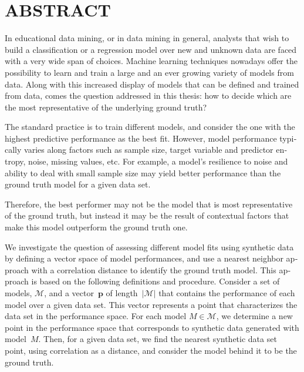 %

\chapter*{ABSTRACT}\thispagestyle{headings}
%
\begin{otherlanguage}{english}

In educational data mining, or in data mining in general, analysts that wish to build a classification or a regression model over new and unknown data are faced with a very wide span of choices.  Machine learning techniques nowadays offer the possibility to learn and train a large and an ever growing variety of models from data. Along with this increased display of models that can be defined and trained from data, comes the question addressed in this thesis: how to decide which are the most representative of the underlying ground truth?

The standard practice is to train different models, and consider the one with the highest predictive performance as the best fit. However, model performance typically varies along factors such as sample size, target variable and predictor entropy, noise, missing values, etc.  For example, a model's resilience to noise and ability to deal with small sample size may yield better performance than the ground truth model for a given data set.  

Therefore, the best performer may not be the model that is most representative of the ground truth, but instead it may be the result of contextual factors that make this model outperform the ground truth one.  

We investigate the question of assessing different model fits using synthetic data by defining a vector space of model performances, and use a nearest neighbor approach with a correlation distance to identify the ground truth model.  This approach is based on the following definitions and procedure.  Consider a set of models, $\mathcal{M}$, and a vector~$\mathbf{p}$ of length~$|\mathcal{M}|$ that contains the performance of each model over a given data set.  This vector represents a point that characterizes the data set in the performance space.  For each model $M \in \mathcal{M}$, we determine a new point in the performance space that corresponds to synthetic data generated with model~$M$.  Then, for a given data set, we find the nearest synthetic data set point, using correlation as a distance, and consider the model behind it to be the ground truth.


\end{otherlanguage}

